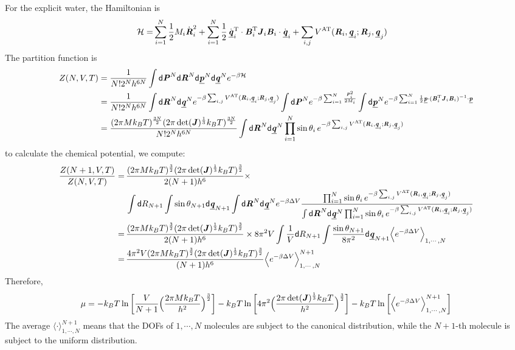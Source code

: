 \documentclass[aip,jcp,a4paper,reprint,onecolumn]{revtex4-1}
\newcommand{\vect}[1]{\textbf{\textit{#1}}}
\newcommand{\dd}[0]{\textsf{d}}
\newcommand{\AT}{{\textrm{{AT}}}}
\newcommand{\trans}{\textrm{T}}
\newcommand{\dgenq}{\dot{\underline{\vect q}}}
\newcommand{\genq}{{\underline{\vect q}}}
\newcommand{\genp}{{\underline{\vect p}}}
\begin{document}
For the explicit water, the Hamiltonian is 
\begin{align}
  \mathcal H =&
  \sum_{i=1}^N\frac 12 M_i\dot{\vect R}_i^2 +
  \sum_{i=1}^N\frac 12\,
  \dgenq_i^\trans \cdot\vect B_i^\trans \vect J_i \vect B_i\cdot\dgenq_i
  +
  \sum_{i,j} V^\AT(\vect R_i, \genq_i; \vect R_j, \genq_j) 
\end{align}
The partition function is
\begin{align}\nonumber
  Z(N, V, T)
  &=
  \frac{1}{N! 2^N h^{6N}}
  \int \dd\vect P^N \dd\vect R^N \dd\genp^N \dd\genq^N
  e^{-\beta \mathcal H}\\\nonumber
  &=
  \frac{1}{N! 2^N h^{6N}}
  \int \dd\vect R^N\dd \genq^N
  e^{-\beta\sum_{i,j} V^\AT(\vect R_i, \genq_i; \vect R_j, \genq_j) }
  \int \dd\vect P^N
  e^{-\beta \sum_{i=1}^N\frac{{\vect P}_i^2}{2M_i}}
  \int \dd\genp^N
  e^{-\beta \sum_{i=1}^N\frac12 \genp\cdot(\vect B_i^\trans\vect J_i\vect B_i)^{-1}\cdot\genp}\\
  &=
  \frac{(2\pi M k_BT)^\frac{3N}2 (2\pi \det(\vect J)^\frac13 k_BT)^\frac{3N}2}
  {N! 2^N h^{6N}}
  \int \dd\vect R^N\dd \genq^N
  \prod_{i=1}^N \sin\theta_i\,
  e^{-\beta\sum_{i,j} V^\AT(\vect R_i, \genq_i; \vect R_j, \genq_j) }  
\end{align}
to calculate the chemical potential, we compute:
\begin{align}\nonumber
  \frac{Z(N+1, V, T)}
  {Z(N, V, T)}
  =&\,
  \frac{(2\pi M k_BT)^\frac{3}2 (2\pi \det(\vect J)^\frac13 k_BT)^\frac{3}2 }{ 2 (N+1) h^6 }\times \\\nonumber
  &\,
  \int \dd R_{N+1} \int\sin\theta_{N+1}\dd\genq_{N+1}
  \int \dd\vect R^N\dd \genq^N
  e^{-\beta\Delta V}
  \frac{
    \prod_{i=1}^N \sin\theta_i\,
    e^{-\beta\sum_{i,j} V^\AT(\vect R_i, \genq_i; \vect R_j, \genq_j) }
  }
  {
    \int \dd\vect R^N\dd \genq^N
    \prod_{i=1}^N \sin\theta_i\,
    e^{-\beta\sum_{i,j} V^\AT(\vect R_i, \genq_i; \vect R_j, \genq_j) }
  } \\\nonumber
  =&\,
  \frac{(2\pi M k_BT)^\frac{3}2 (2\pi \det(\vect J)^\frac13 k_BT)^\frac{3}2 }{ 2 (N+1) h^6 } \times
   8\pi^2 V
  \int \frac1V\dd R_{N+1} \int \frac{\sin\theta_{N+1}}{8\pi^2}\dd\genq_{N+1}
  \Big\langle
  e^{-\beta\Delta V}
  \Big\rangle_{1,\cdots,N} \\
  =&\,
  \frac{4\pi^2 V (2\pi M k_BT)^\frac{3}2 (2\pi \det(\vect J)^\frac13 k_BT)^\frac{3}2 }{ (N+1) h^6 }
  \Big\langle
  e^{-\beta\Delta V}
  \Big\rangle_{1,\cdots,N}^{N+1}  
\end{align}
Therefore,
\begin{align}
  \mu = -k_BT \ln
  \bigg[
  \frac V{N+1}
  \Big(
  \frac{2\pi M k_BT}{h^2}
  \Big)^\frac32
  \bigg]
  -
  k_BT\ln
  \bigg[
  4\pi^2
  \Big(
  \frac{2\pi \det(\vect J)^\frac13 k_BT}{h^2}
  \Big)^\frac32
  \bigg]
  -
  k_BT\ln
  \bigg[
  \Big\langle
  e^{-\beta\Delta V}
  \Big\rangle_{1,\cdots,N}^{N+1}  
  \bigg]  
\end{align}
The average $\langle\cdot\rangle_{1,\cdots,N}^{N+1}$ means that the
DOFs of $1,\cdots,N$ molecules are subject to the canonical distribution,
while the $N+1$-th molecule is subject to the uniform distribution.
\end{document}
